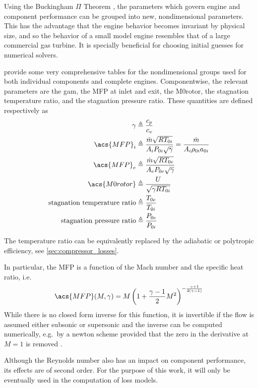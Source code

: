 Using the Buckingham $\Pi$ Theorem \cite{Buckingham1914},
the parameters which govern engine and component performance can be grouped into new, nondimensional parameters. 
This has the advantage that the engine behavior becomes invariant by physical size, and so the behavior of a small model engine resembles that of a large commercial gas turbine. 
It is specially beneficial for choosing initial guesses for numerical solvers.

\textcite[chapter 4]{walsh2004gas} provide some very comprehensive tables 
for the nondimensional groups used for both individual components and complete engines.
Componentwise, the relevant parameters are the \acl{gam}, the \acl{MFP} at inlet and exit, 
the \acl{M0rotor}, the stagnation temperature ratio, and the stagnation pressure ratio. 
These quantities are defined respectively as
\begin{align}
    \gamma &\triangleq \frac{c_p}{c_v} \\
    \acs{MFP}_i &\triangleq \MFP{i} = \MFPalt{i} \label{eqn:MFPi}\\
    \acs{MFP}_e &\triangleq \MFP{e} \\
    \acs{M0rotor} &\triangleq \frac{U}{\sqrt{\gamma R T_{0i}}} \\
    \text{stagnation temperature ratio}&\triangleq\tr{0e}{0i} \\
    \text{stagnation pressure ratio}&\triangleq\pr{0e}{0i}
\end{align}

The temperature ratio can be equivalently replaced by the adiabatic or polytropic efficiency,
see \cref{sec:compressor_losses}.

In particular, the \acl{MFP} is a function of the Mach number and the specific heat ratio,
 i.e.\
\begin{equation}
    \label{eqn:mfp2mach}
    \acs{MFP}(M,\gamma) = M \left( 1 + \frac{\gamma-1}{2}M^2\right)^{-\frac{\gamma+1}{2(\gamma-1)}}
\end{equation}
While there is no closed form inverse for this function, it is invertible if the flow is assumed either subsonic or supersonic and the inverse can be computed numerically, e.g.\ by a newton scheme provided that the zero in the derivative at $M=1$ is removed \cite{Der1974}.

Although the Reynolds number also has an impact on component performance, 
its effects are of second order\cite{walsh2004gas}. 
For the purpose of this work, it will only be eventually used in the computation of loss models.


